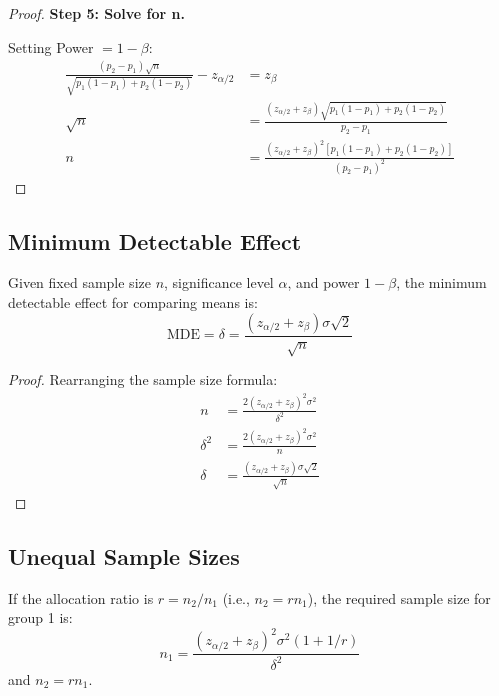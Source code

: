 \begin{proof}
\textbf{Step 5: Solve for n.}

Setting Power $= 1 - \beta$:
\begin{align}
\frac{(p_2-p_1)\sqrt{n}}{\sqrt{p_1(1-p_1) + p_2(1-p_2)}} - z_{\alpha/2} &= z_\beta \\
\sqrt{n} &= \frac{(z_{\alpha/2} + z_\beta)\sqrt{p_1(1-p_1) + p_2(1-p_2)}}{p_2 - p_1} \\
n &= \frac{(z_{\alpha/2} + z_\beta)^2[p_1(1-p_1) + p_2(1-p_2)]}{(p_2 - p_1)^2}
\end{align}
\end{proof}

\subsection{Minimum Detectable Effect}

\begin{corollary}
Given fixed sample size $n$, significance level $\alpha$, and power $1-\beta$, the minimum detectable effect for comparing means is:
\begin{equation}
\text{MDE} = \delta = \frac{(z_{\alpha/2} + z_\beta)\sigma\sqrt{2}}{\sqrt{n}}
\end{equation}
\end{corollary}

\begin{proof}
Rearranging the sample size formula:
\begin{align}
n &= \frac{2(z_{\alpha/2} + z_\beta)^2 \sigma^2}{\delta^2} \\
\delta^2 &= \frac{2(z_{\alpha/2} + z_\beta)^2 \sigma^2}{n} \\
\delta &= \frac{(z_{\alpha/2} + z_\beta)\sigma\sqrt{2}}{\sqrt{n}}
\end{align}
\end{proof}

\subsection{Unequal Sample Sizes}

\begin{theorem}
If the allocation ratio is $r = n_2/n_1$ (i.e., $n_2 = rn_1$), the required sample size for group 1 is:
\begin{equation}
n_1 = \frac{(z_{\alpha/2} + z_\beta)^2 \sigma^2(1 + 1/r)}{\delta^2}
\end{equation}
and $n_2 = rn_1$.
\end{theorem}

